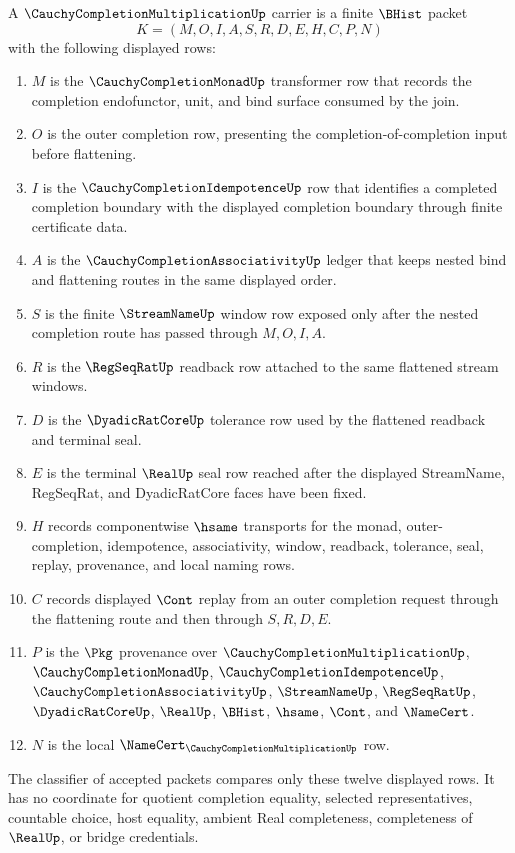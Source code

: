 \begin{definition}
\label{def:cauchy-completion-multiplication-carrier}
A $\CauchyCompletionMultiplicationUp$ carrier is a finite $\BHist$ packet
$$
K=(M,O,I,A,S,R,D,E,H,C,P,N)
$$
with the following displayed rows:
\begin{enumerate}
\item $M$ is the $\CauchyCompletionMonadUp$ transformer row that records the completion endofunctor, unit, and bind surface consumed by the join.
\item $O$ is the outer completion row, presenting the completion-of-completion input before flattening.
\item $I$ is the $\CauchyCompletionIdempotenceUp$ row that identifies a completed completion boundary with the displayed completion boundary through finite certificate data.
\item $A$ is the $\CauchyCompletionAssociativityUp$ ledger that keeps nested bind and flattening routes in the same displayed order.
\item $S$ is the finite $\StreamNameUp$ window row exposed only after the nested completion route has passed through $M,O,I,A$.
\item $R$ is the $\RegSeqRatUp$ readback row attached to the same flattened stream windows.
\item $D$ is the $\DyadicRatCoreUp$ tolerance row used by the flattened readback and terminal seal.
\item $E$ is the terminal $\RealUp$ seal row reached after the displayed StreamName, RegSeqRat, and DyadicRatCore faces have been fixed.
\item $H$ records componentwise $\hsame$ transports for the monad, outer-completion, idempotence, associativity, window, readback, tolerance, seal, replay, provenance, and local naming rows.
\item $C$ records displayed $\Cont$ replay from an outer completion request through the flattening route and then through $S,R,D,E$.
\item $P$ is the $\Pkg$ provenance over $\CauchyCompletionMultiplicationUp$, $\CauchyCompletionMonadUp$, $\CauchyCompletionIdempotenceUp$, $\CauchyCompletionAssociativityUp$, $\StreamNameUp$, $\RegSeqRatUp$, $\DyadicRatCoreUp$, $\RealUp$, $\BHist$, $\hsame$, $\Cont$, and $\NameCert$.
\item $N$ is the local $\NameCert_{\CauchyCompletionMultiplicationUp}$ row.
\end{enumerate}
The classifier of accepted packets compares only these twelve displayed rows. It has no coordinate for quotient completion equality, selected representatives, countable choice, host equality, ambient Real completeness, completeness of $\RealUp$, or bridge credentials.
\end{definition}

